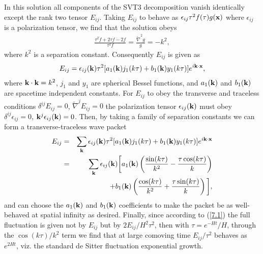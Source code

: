 In this solution all components of the SVT3 decomposition vanish identically except the rank two tensor $E_{ij}$. Taking $E_{ij}$ to behave as $\epsilon_{ij}\tau^2f(\tau)g({\bf x})$ where $\epsilon_{ij}$ is a polarization tensor, we find that the solution obeys
%
\begin{eqnarray}
\frac{\tau^2 \ddot{f}+2\tau \dot{f}-2f}{\tau^2f}=\frac{\tilde{\nabla}^2g}{g}=-k^2,
\label{7.18}
\end{eqnarray}
%
where $k^2$ is a separation constant. Consequently $E_{ij}$ is given as
%
\begin{eqnarray}
E_{ij}=\epsilon_{ij}({\bf k})\tau^2[a_1({\bf k})j_1(k\tau)+b_1({\bf k})y_1(k\tau)]e^{i{\bf k}\cdot{\bf x}},
\label{7.19}
\end{eqnarray}
%
where ${\bf k}\cdot{\bf k}=k^2$, $j_1$ and $y_1$ are spherical Bessel functions, and $a_1({\bf k})$ and $b_1({\bf k})$ are spacetime independent constants. For $E_{ij}$ to obey the transverse and traceless conditions $\delta^{ij}E_{ij}=0$, $\tilde{\nabla}^jE_{ij}=0$ the polarization tensor $\epsilon_{ij}({\bf k})$ must obey $\delta^{ij}\epsilon_{ij}=0$, ${\bf k}^{j}\epsilon_{ij}({\bf k})=0$.
Then, by taking a family of separation constants we can form a transverse-traceless wave packet
%
\begin{eqnarray}
E_{ij}&=&\sum_{\bf k}\epsilon_{ij}({\bf k})\tau^2[a_1({\bf k})j_1(k\tau)+b_1({\bf k})y_1(k\tau)]e^{i{\bf k}\cdot{\bf x}}\nonumber\\
&=&
\sum_{\bf k}\epsilon_{ij}({\bf k})\bigg[a_1({\bf k})\left(\frac{\sin(k\tau)}{k^2}-\frac{\tau\cos(k\tau)}{k}\right)
\nonumber\\
&&+b_1({\bf k})\left(\frac{\cos(k\tau)}{k^2}+\frac{\tau\sin(k\tau)}{k}\right)\bigg],
\label{7.20}
\end{eqnarray}
%
and can choose the $a_1({\bf k})$ and $b_1({\bf k})$ coefficients to make the packet be as well-behaved at spatial infinity as desired. Finally, since according to (\ref{7.1}) the full fluctuation is given not by $E_{ij}$ but by $2E_{ij}/H^2\tau^2$, then with $\tau=e^{-Ht}/H$, through the $\cos(k\tau)/k^2$ term we find that at large comoving time  $E_{ij}/\tau^2$ behaves as $e^{2Ht}$, viz. the standard de Sitter fluctuation exponential growth.

